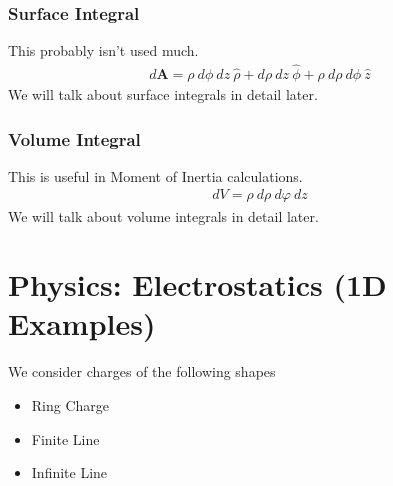 \documentclass{article}
\begin{document}
\subsubsection{Surface Integral}
This probably isn't used much.
\begin{align}
{d\mathbf{A}} = \rho\ d \phi\ d z\ \hat{{\rho}} 
+d \rho\ d z\ \hat{{\phi}}
+\rho\ d \rho\ d \phi\ \hat{{z}}
\end{align}
We will talk about surface integrals in detail later.
\subsubsection{Volume Integral}
This is useful in Moment of Inertia calculations.
\begin{align}
dV = \rho\ d \rho\ d \varphi\ d z
\end{align}
We will talk about volume integrals in detail later.

\section{Physics: Electrostatics (1D Examples)}
We consider charges of the following shapes
\begin{itemize}
    \item Ring Charge
    \item Finite Line 
    \item Infinite Line 
\end{itemize}
\end{document}
